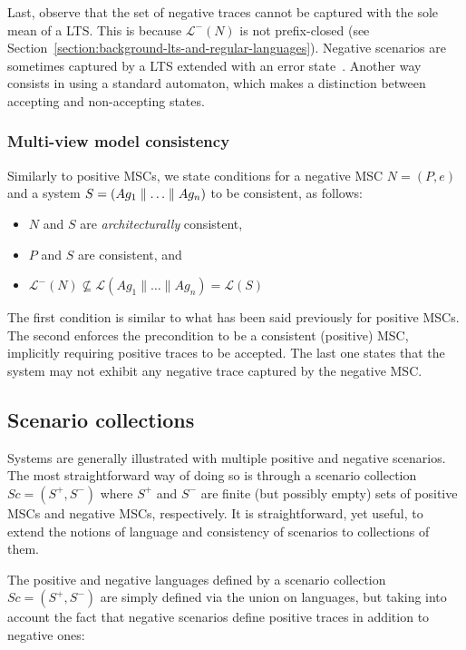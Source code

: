 Last, observe that the set of negative traces cannot be captured with the sole mean of a LTS. This is because $\mathcal{L}^{-}(N)$ is not prefix-closed (see Section~\ref{section:background-lts-and-regular-languages}). Negative scenarios are sometimes captured by a LTS extended with an error state~\cite{Uchitel:2004}. Another way consists in using a standard automaton, which makes a distinction between accepting and non-accepting states. 

\subsubsection*{Multi-view model consistency}

Similarly to positive MSCs, we state conditions for a negative MSC $N = (P,e)$ and a system $S = (Ag_1 \parallel \ldots \parallel Ag_n)$ to be consistent, as follows:

\begin{itemize}
\item $N$ and $S$ are \emph{architecturally} consistent,
\item $P$ and $S$ are consistent, and
\item $\mathcal{L}^{-}(N) \not\subseteq \mathcal{L}(Ag_1 \parallel \ldots \parallel Ag_n) = \mathcal{L}(S)$
\end{itemize}

The first condition is similar to what has been said previously for positive MSCs. The second enforces the precondition to be a consistent (positive) MSC, implicitly requiring positive traces to be accepted. The last one states that the system may not exhibit any negative trace captured by the negative MSC.

\subsection{Scenario collections}

Systems are generally illustrated with multiple positive and negative scenarios. The most straightforward way of doing so is through a scenario collection $Sc = (S^+,S^-)$ where $S^+$ and $S^-$ are finite (but possibly empty) sets of positive MSCs and negative MSCs, respectively. It is straightforward, yet useful, to extend the notions of language and consistency of scenarios to collections of them. 

The positive and negative languages defined by a scenario collection $Sc = (S^+,S^-)$ are simply defined via the union on languages, but taking into account the fact that negative scenarios define positive traces in addition to negative ones:


